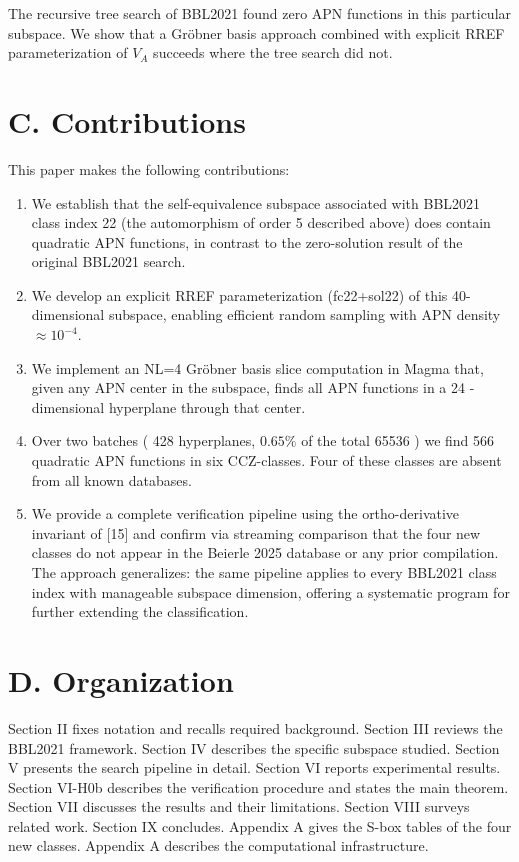 \documentclass[10pt]{article}
\begin{document}
The recursive tree search of BBL2021 found zero APN functions in this particular subspace. We show that a Gröbner basis approach combined with explicit RREF parameterization of $V_{A}$ succeeds where the tree search did not.

\section*{C. Contributions}
This paper makes the following contributions:

\begin{enumerate}
  \item We establish that the self-equivalence subspace associated with BBL2021 class index 22 (the automorphism of order 5 described above) does contain quadratic APN functions, in contrast to the zero-solution result of the original BBL2021 search.
  \item We develop an explicit RREF parameterization (fc22+sol22) of this 40-dimensional subspace, enabling efficient random sampling with APN density $\approx 10^{-4}$.
  \item We implement an NL=4 Gröbner basis slice computation in Magma that, given any APN center in the subspace, finds all APN functions in a 24 -dimensional hyperplane through that center.
  \item Over two batches ( 428 hyperplanes, $0.65 \%$ of the total 65536 ) we find 566 quadratic APN functions in six CCZ-classes. Four of these classes are absent from all known databases.
  \item We provide a complete verification pipeline using the ortho-derivative invariant of [15] and confirm via streaming comparison that the four new classes do not appear in the Beierle 2025 database or any prior compilation.\\
The approach generalizes: the same pipeline applies to every BBL2021 class index with manageable subspace dimension, offering a systematic program for further extending the classification.
\end{enumerate}

\section*{D. Organization}
Section II fixes notation and recalls required background. Section III reviews the BBL2021 framework. Section IV describes the specific subspace studied. Section V presents the search pipeline in detail. Section VI reports experimental results. Section VI-H0b describes the verification procedure and states the main theorem. Section VII discusses the results and their limitations. Section VIII surveys related work. Section IX concludes. Appendix A gives the S-box tables of the four new classes. Appendix A describes the computational infrastructure.
\end{document}
